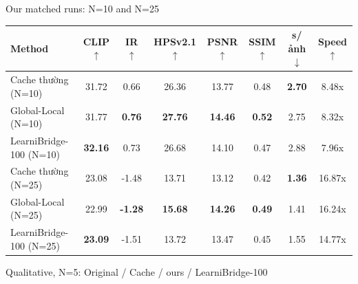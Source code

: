 \begin{frame}{Our matched runs: N=10 and N=25}
\begin{center}\scriptsize
\setlength{\tabcolsep}{3pt}
\renewcommand{\arraystretch}{1.15}
\begin{tabular}{lccccccc}
\toprule
Method & \textbf{CLIP $\uparrow$} & \textbf{IR $\uparrow$} & \textbf{HPSv2.1 $\uparrow$} & \textbf{PSNR $\uparrow$} & \textbf{SSIM $\uparrow$} & \textbf{s/ảnh $\downarrow$} & \textbf{Speed $\uparrow$} \\
\midrule
Cache thường (N=10) & 31.72 & 0.66 & 26.36 & 13.77 & 0.48 & \textbf{\textcolor{wrsGreen}{2.70}} & 8.48x \\
Global-Local (N=10)\newline{\tiny\color{wrsMuted}(ours)} & 31.77 & \textbf{\textcolor{wrsGreen}{0.76}} & \textbf{\textcolor{wrsGreen}{27.76}} & \textbf{\textcolor{wrsGreen}{14.46}} & \textbf{\textcolor{wrsGreen}{0.52}} & 2.75 & 8.32x \\
LearniBridge-100 (N=10) & \textbf{\textcolor{wrsGreen}{32.16}} & 0.73 & 26.68 & 14.10 & 0.47 & 2.88 & 7.96x \\
Cache thường (N=25) & 23.08 & -1.48 & 13.71 & 13.12 & 0.42 & \textbf{\textcolor{wrsGreen}{1.36}} & 16.87x \\
Global-Local (N=25)\newline{\tiny\color{wrsMuted}(ours)} & 22.99 & \textbf{\textcolor{wrsGreen}{-1.28}} & \textbf{\textcolor{wrsGreen}{15.68}} & \textbf{\textcolor{wrsGreen}{14.26}} & \textbf{\textcolor{wrsGreen}{0.49}} & 1.41 & 16.24x \\
LearniBridge-100 (N=25) & \textbf{\textcolor{wrsGreen}{23.09}} & -1.51 & 13.72 & 13.47 & 0.45 & 1.55 & 14.77x \\
\bottomrule
\end{tabular}
\end{center}
\vspace{0.25em}
\end{frame}

\begin{frame}{Qualitative, N=5: Original / Cache / ours / LearniBridge-100}
\vspace{0.3em}
\end{frame}

